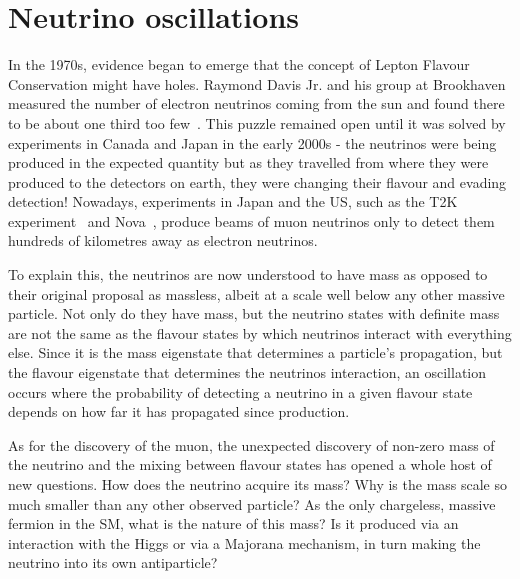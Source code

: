 \section{Neutrino oscillations}
In the 1970s, evidence began to emerge that the concept of Lepton Flavour Conservation might have holes.
Raymond Davis Jr. and his group at Brookhaven measured the number of electron neutrinos coming from the sun and found there to be about one third too few~\cite{}.
This puzzle remained open until it was solved by experiments in Canada and Japan in the early 2000s - the neutrinos were being produced in the expected quantity but as they travelled from where they were produced to the detectors on earth, they were changing their flavour and evading detection!
Nowadays, experiments in Japan and the US, such as the T2K experiment~\cite{T2K:nim} and Nova~\cite{}, produce beams of muon neutrinos only to detect them hundreds of kilometres away as electron neutrinos.

To explain this, the neutrinos are now understood to have mass as opposed to their original proposal as massless, albeit at a scale well below any other massive particle.
Not only do they have mass, but the neutrino states with definite mass are not the same as the flavour states by which neutrinos interact with everything else.
Since it is the mass eigenstate that determines a particle's propagation, but the flavour eigenstate that determines the neutrinos interaction, an oscillation occurs where the probability of detecting a neutrino in a given flavour state depends on how far it has propagated since production.

As for the discovery of the muon, the unexpected  discovery of non-zero mass of the neutrino and the mixing between flavour states has opened a whole host of new questions.
How does the neutrino acquire its mass?
  Why is the mass scale so much smaller than any other observed particle?
As the only chargeless, massive fermion in the \ac{SM}, what is the nature of this mass?
Is it produced via an interaction with the Higgs or via a Majorana mechanism, in turn making the neutrino into its own antiparticle?

